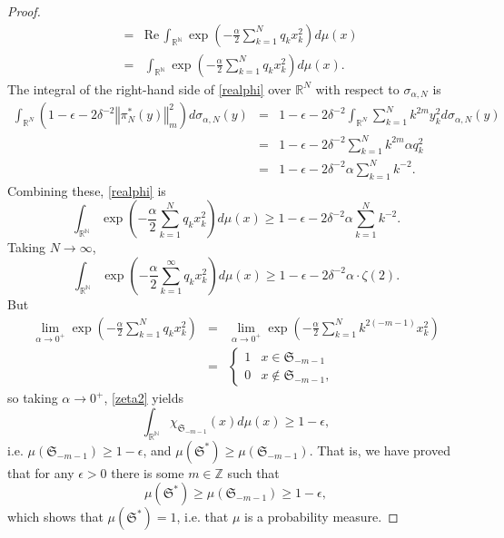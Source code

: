 \documentclass{article}
\def\Re{\ensuremath{\mathrm{Re}}\,}
\newcommand{\norm}[1]{\left\Vert #1 \right\Vert}
\theoremstyle{definition}
\theoremstyle{definition}
\begin{document}
\begin{proof}
\begin{eqnarray*}
&=&\Re \int_{\mathbb{R}^\mathbb{N}} \exp\left( -\frac{\alpha}{2}\sum_{k=1}^N q_k x_k^2 \right) d\mu(x)\\
&=& \int_{\mathbb{R}^\mathbb{N}} \exp\left( -\frac{\alpha}{2}\sum_{k=1}^N q_k x_k^2 \right) d\mu(x).
\end{eqnarray*}
The integral of the right-hand side of \eqref{realphi} over $\mathbb{R}^N$ with respect to $\sigma_{\alpha,N}$ is
\begin{eqnarray*}
\int_{\mathbb{R}^N} (1-\epsilon-2\delta^{-2} \norm{\pi_N^*(y)}_m^2) d\sigma_{\alpha,N}(y)&=&
1-\epsilon-2\delta^{-2}\int_{\mathbb{R}^N} \sum_{k=1}^N k^{2m} y_k^2 d\sigma_{\alpha,N}(y)\\
&=&1-\epsilon-2\delta^{-2} \sum_{k=1}^N k^{2m} \alpha q_k^2\\
&=&1-\epsilon-2\delta^{-2} \alpha \sum_{k=1}^N k^{-2}.
\end{eqnarray*}
Combining these, \eqref{realphi} is
\[
 \int_{\mathbb{R}^\mathbb{N}} \exp\left( -\frac{\alpha}{2}\sum_{k=1}^N q_k x_k^2 \right) d\mu(x) \geq 1-\epsilon-2\delta^{-2} \alpha \sum_{k=1}^N k^{-2}.
\]
Taking $N \to \infty$,
\begin{equation}
 \int_{\mathbb{R}^\mathbb{N}} \exp\left( -\frac{\alpha}{2}\sum_{k=1}^\infty q_k x_k^2 \right) d\mu(x) \geq 1-\epsilon-2\delta^{-2} \alpha \cdot \zeta(2).
 \label{zeta2}
\end{equation}
But  
\begin{eqnarray*}
\lim_{\alpha \to 0^+} \exp\left( -\frac{\alpha}{2}\sum_{k=1}^N q_k x_k^2 \right) 
&=&
\lim_{\alpha \to 0^+} \exp\left( -\frac{\alpha}{2}\sum_{k=1}^N k^{2(-m-1)} x_k^2 \right)\\
&=& \begin{cases}
1&x \in \mathfrak{S}_{-m-1}\\
0&x \not \in \mathfrak{S}_{-m-1},
\end{cases}
\end{eqnarray*}
so taking $\alpha \to 0^+$, \eqref{zeta2} yields
\[
\int_{\mathbb{R}^\mathbb{N}} \chi_{\mathfrak{S}_{-m-1}}(x) d\mu(x) \geq 1-\epsilon,
\]
i.e. $\mu(\mathfrak{S}_{-m-1}) \geq 1-\epsilon$, and $\mu(\mathfrak{S}^*) \geq \mu(\mathfrak{S}_{-m-1})$.
That is, we have proved that  for any $\epsilon>0$ there is some $m \in \mathbb{Z}$ such that
\[
\mu(\mathfrak{S}^*) \geq \mu(\mathfrak{S}_{-m-1}) \geq 1-\epsilon,
\]
which shows that $\mu(\mathfrak{S}^*)=1$, i.e. that $\mu$ is a probability measure.
\end{proof}
\end{document}
